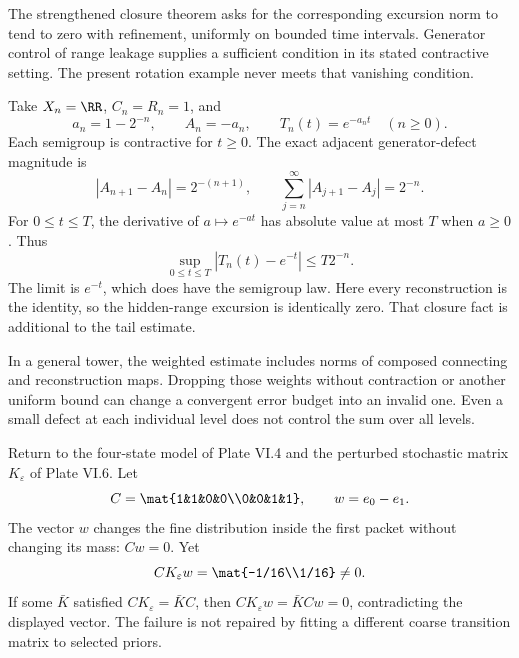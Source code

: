 The strengthened closure theorem asks for the corresponding excursion norm to tend to zero with refinement, uniformly on bounded time intervals. Generator control of range leakage supplies a sufficient condition in its stated contractive setting. The present rotation example never meets that vanishing condition.

Take $X_n=\RR$, $C_n=R_n=1$, and
\[
a_n=1-2^{-n},\qquad A_n=-a_n,\qquad T_n(t)=e^{-a_nt}\quad(n\ge0).
\]
Each semigroup is contractive for $t\ge0$. The exact adjacent generator-defect magnitude is
\[
|A_{n+1}-A_n|=2^{-(n+1)},\qquad
\sum_{j=n}^{\infty}|A_{j+1}-A_j|=2^{-n}.
\]
For $0\le t\le T$, the derivative of $a\mapsto e^{-at}$ has absolute value at most $T$ when $a\ge0$. Thus
\[
\sup_{0\le t\le T}|T_n(t)-e^{-t}|\le T2^{-n}.
\]
The limit is $e^{-t}$, which does have the semigroup law. Here every reconstruction is the identity, so the hidden-range excursion is identically zero. That closure fact is additional to the tail estimate.

In a general tower, the weighted estimate includes norms of composed connecting and reconstruction maps. Dropping those weights without contraction or another uniform bound can change a convergent error budget into an invalid one. Even a small defect at each individual level does not control the sum over all levels.

Return to the four-state model of Plate VI.4 and the perturbed stochastic matrix $K_\varepsilon$ of Plate VI.6. Let
\[
C=\mat{1&1&0&0\\0&0&1&1},\qquad w=e_0-e_1.
\]
The vector $w$ changes the fine distribution inside the first packet without changing its mass: $Cw=0$. Yet
\[
CK_\varepsilon w=\mat{-1/16\\1/16}\ne0.
\]
If some $\bar K$ satisfied $CK_\varepsilon=\bar KC$, then $CK_\varepsilon w=\bar KCw=0$, contradicting the displayed vector. The failure is not repaired by fitting a different coarse transition matrix to selected priors.

